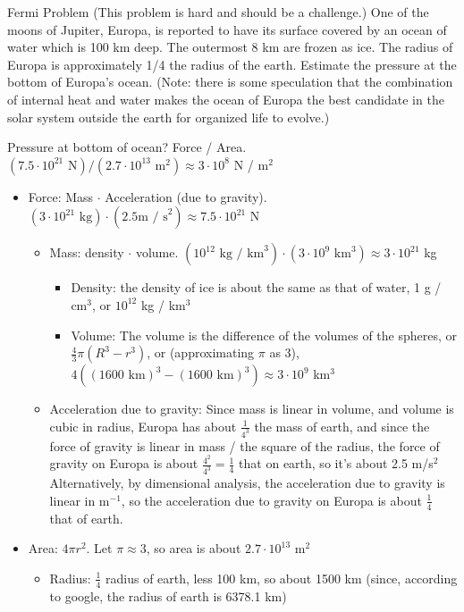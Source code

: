 \documentclass{esg8012pset}
\date{September 8}
\begin{document}
\begin{problem}{Fermi Problem (This problem is hard and should be a challenge.)}
  One of the moons of Jupiter, Europa, is reported to have its surface covered by an ocean of water 
  which is 100 km deep.  The outermost 8 km are frozen as ice. The radius of Europa is
  approximately 1/4 the radius of the earth. Estimate the pressure at the bottom of Europa's ocean.
  (Note: there is some speculation that the combination of internal heat and water makes the ocean
  of Europa the best candidate in the solar system outside the earth for organized life to evolve.)
\end{problem}%
\begin{solution}
  Pressure at bottom of ocean?  Force / Area.  $(7.5\cdot 10^{21}\text{ N}) / (2.7 \cdot 10^{13}\text{ m}^2) \approx 3 \cdot 10^8$ N / m$^2$
  \begin{itemize}
    \item Force: Mass $\cdot$ Acceleration (due to gravity). $(3 \cdot 10^{21}\text{ kg}) \cdot (2.5\text{m / s}^2) \approx 7.5\cdot 10^{21}$ N
      \begin{itemize}
        \item Mass: density $\cdot$ volume.  $(10^{12}\text{ kg / km}^3) \cdot (3 \cdot 10^9\text{ km}^3) \approx 3 \cdot 10^{21}$ kg
          \begin{itemize}
            \item Density: the density of ice is about the same as that of water, 1 g / cm$^3$, or $10^{12}$ kg / km$^3$
            \item Volume: The volume is the difference of the volumes of the spheres, or $\frac{4}{3}\pi (R^3 - r^3)$, or (approximating $\pi$ as 3), $4((1600\text{ km})^3 - (1600\text{ km})^3) \approx 3 \cdot 10^9$ km$^3$
          \end{itemize}
        \item Acceleration due to gravity: Since mass is linear in volume, and volume is cubic in radius, Europa has about $\frac{1}{4^3}$ the mass of earth, and since the force of gravity is linear in mass / the square of the radius, the force of gravity on Europa is about $\frac{4^2}{4^3} = \frac{1}{4}$ that on earth, so it's about 2.5 m/s$^2$  Alternatively, by dimensional analysis, the acceleration due to gravity is linear in m$^{-1}$, so the acceleration due to gravity on Europa is about $\frac{1}{4}$ that of earth.
      \end{itemize}
    \item Area: $4\pi r^2$.  Let $\pi \approx 3$, so area is about $2.7 \cdot 10^{13}$ m$^2$
      \begin{itemize}
        \item Radius: $\frac{1}{4}$ radius of earth, less 100 km, so about 1500 km (since, according to google, the radius of earth is 6378.1 km)
      \end{itemize}
  \end{itemize}


\end{solution}
\end{document}
